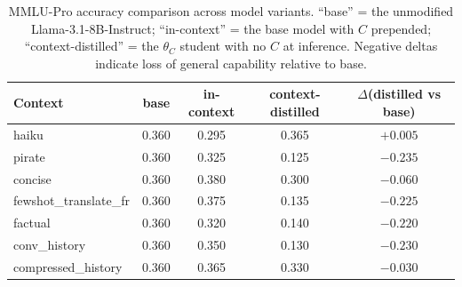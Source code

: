 \begin{table}[t]
\centering
\caption{MMLU-Pro accuracy comparison across model variants.
``base'' = the unmodified Llama-3.1-8B-Instruct; ``in-context'' = the
base model with $C$ prepended; ``context-distilled'' = the
$\theta_C$ student with no $C$ at inference. Negative deltas indicate
loss of general capability relative to base.}
\label{tab:mmlu}
\small
\begin{tabular}{lcccc}
\toprule
Context & base & in-context & context-distilled & $\Delta$(distilled vs base) \\
\midrule
haiku                  & 0.360 & 0.295 & 0.365 & $+0.005$ \\
pirate                 & 0.360 & 0.325 & 0.125 & $\mathbf{-0.235}$ \\
concise                & 0.360 & 0.380 & 0.300 & $-0.060$ \\
fewshot\_translate\_fr & 0.360 & 0.375 & 0.135 & $\mathbf{-0.225}$ \\
factual                & 0.360 & 0.320 & 0.140 & $\mathbf{-0.220}$ \\
conv\_history          & 0.360 & 0.350 & 0.130 & $\mathbf{-0.230}$ \\
compressed\_history    & 0.360 & 0.365 & 0.330 & $-0.030$ \\
\bottomrule
\end{tabular}
\end{table}

